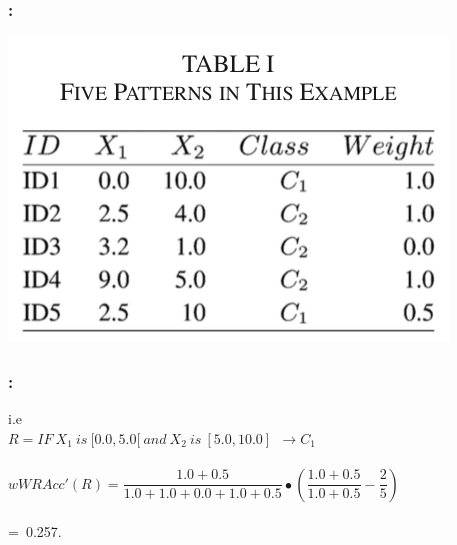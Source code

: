 \documentclass{beamer}
\begin{document}
\begin{CJK*}{UTF8}{bsmi}
\begin{frame}
\begin{itemize}
		\end{itemize}
	
\end{frame}


\begin{frame}
	\frametitle{\insertsection : \insertsubsection}
\begin{center}
\includegraphics[height=.6\textheight]{./3.png}
\end{center}
\end{frame}



\begin{frame}
	\frametitle{\insertsection : \insertsubsection}

	\begin{block}{ i.e}
		~\\
		\centering\textbf{$R = IF~ X_{1}~ is~ [0.0,5.0[ ~and ~X_{2} ~is~ [5.0,10.0]~~ → C_{1}$}\\
		~\\
		\centering\textbf{$wWRAcc'  (R)=\dfrac{1.0+0.5}{1.0+1.0+0.0+1.0+0.5}\bullet(\dfrac{1.0+0.5}{1.0+0.5}-\dfrac{2}{5})$}\\
		~\\
		=~0.257.~~~~~~~~~~~~~~~~~~~~~~~~~~~~~
		~\\
	\end{block}
	
	
\end{frame}



\end{CJK*}
\end{document}
